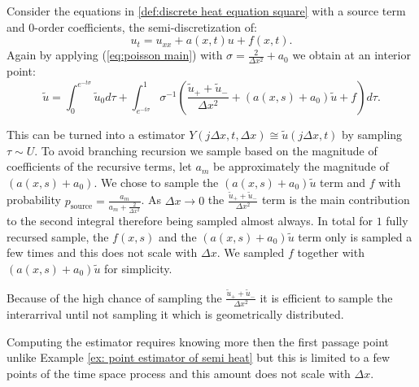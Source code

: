 \documentclass[a4paper,12pt]{article}
\begin{document}
\begin{example} \label{ex:semi heat source}

  Consider the equations in \ref{def:discrete heat equation square} with a source term and $0$-order coefficients, the
  semi-discretization of:
  \begin{equation}
    u_{t} = u_{xx} + a(x,t)u + f(x,t)
    .
  \end{equation}
  Again by applying (\ref{eq:poisson main}) with $\sigma = \frac{2}{\Delta x^{2}} +a_{0}$
  we obtain at an interior point:
  \begin{equation} \label{eq:int semi heat source}
    \tilde{u} =
    \int_{0}^{e^{-t \sigma }} \tilde{u}_{0} d\tau  + \int_{e^{-t \sigma }}^{1}
    \sigma^{-1}
    \left(
    \frac{\tilde{u}_{+} + \tilde{u}_{-}}{\Delta x^{2}} +(a(x,s)+ a_{0}) \tilde{u}+ f
    \right)
    d\tau
    .
  \end{equation}

  This can be turned into a estimator $Y(j \Delta x,t,\Delta x ) \cong  \tilde{u}(j \Delta x,t)$
  by sampling $\tau \sim U$.
  To avoid branching recursion we sample
  based on the magnitude of coefficients of the recursive terms, let $a_m$ be approximately the magnitude of
  $(a(x,s)+ a_{0})$. We chose to sample the $(a(x,s)+ a_{0})\tilde{u}$ term and $f$
  with probability $p_{\text{source}} = \frac{a_m}{a_m + \frac{2}{\Delta x^{2}}}$.
  As $\Delta x \rightarrow 0$ the $\frac{\tilde{u}_{+} + \tilde{u}_{-}}{\Delta x^{2}}$ term is
  the main contribution to the second integral therefore
  being sampled almost always.
  In total for $1$ fully recursed sample,
  the $f(x,s)$ and the $(a(x,s)+ a_{0})\tilde{u}$ term only
  is sampled a few times and this does not scale with $\Delta x$. We
  sampled $f$ together with $(a(x,s)+ a_{0})\tilde{u}$ for simplicity.

\end{example}

\begin{julia}\label{jl:point estimator heat source}
  Because of the high chance of sampling the $\frac{\tilde{u}_{+} + \tilde{u}_{-}}{\Delta x^{2}}$ it is efficient
  to sample the interarrival until not sampling it which is geometrically distributed.

\end{julia}

Computing the estimator requires knowing more then the first passage point
unlike Example \ref{ex: point estimator of semi heat} but this is limited
to a few points of the time space process and this amount does not scale with $\Delta x$.
\end{document}
